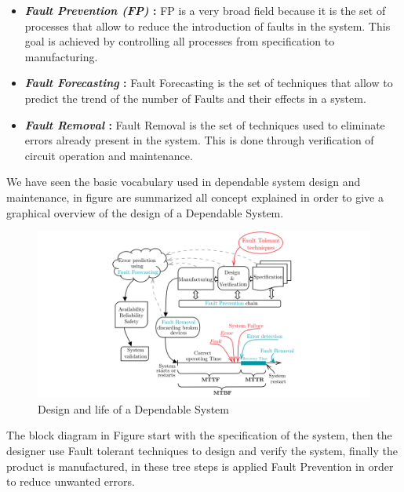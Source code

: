 {{{{\begin{itemize}
					When a fault is detected in a FT system, you can decide to correct it and continue with the execution, or you can disable the system part from which the fault started, in the case of permanent fault. This mode of performances decay of a system is called Graceful Degradation. 
					
					\item \textbf{\textit{Fault Prevention (FP)} : } FP is a very broad field because it is the set of processes that allow to reduce the introduction of faults in the system. This goal is achieved by controlling all processes from specification to manufacturing.
					
					\item \textbf{\textit{Fault Forecasting} : } Fault Forecasting is the set of techniques that allow to predict the trend of the number of Faults and their effects in a system.
					
					\item \textbf{\textit{Fault Removal} : } Fault Removal is the set of techniques used to eliminate errors already present in the system. This is done through verification of circuit operation and maintenance.
				\end{itemize}     	
			} %
			We have seen the basic vocabulary used in dependable system design and maintenance, in figure  are summarized all concept explained in order to give a graphical overview of the design of a Dependable System.  
			\begin{figure}[H]
				\centering
				\includegraphics[scale=0.26,center]{./images/Dependability1.png}
				\caption{Design and life of a Dependable System}
				\label{fig:dependability1}
			\end{figure} 
			The block diagram in Figure  start with the specification of the system, then the designer use Fault tolerant techniques to design and verify the system, finally the product is manufactured, in these tree steps is applied Fault Prevention in order to reduce unwanted errors. 
			
}}}
